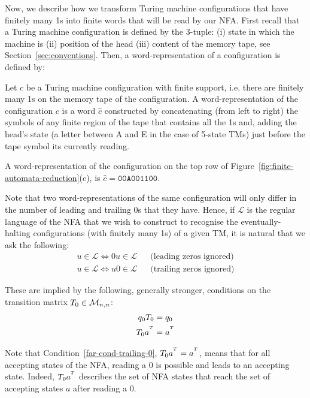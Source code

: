 Now, we describe how we transform Turing machine configurations that have finitely many 1s into finite words that will be read by our NFA. First recall that a Turing machine configuration is defined by the 3-tuple: (i) state in which the machine is (ii) position of the head (iii) content of the memory tape, see Section~\ref{sec:conventions}. Then, a word-representation of a configuration is defined by:

\begin{definition}\label{def:wordc}\normalfont
  Let $c$ be a Turing machine configuration with finite support, i.e. there are finitely many 1s on the memory tape of the configuration. A word-representation of the configuration $c$ is a word $\hat{c}$ constructed by concatenating (from left to right) the symbols of any finite region of the tape that contains all the 1s and, adding the head's state (a letter between A and E in the case of 5-state TMs) just before the tape symbol its currently reading.
\end{definition}

\begin{example}\normalfont
  A word-representation of the configuration on the top row of Figure~\ref{fig:finite-automata-reduction}(c), is $\hat{c} = \texttt{00A001100}$.
\end{example}

Note that two word-representations of the same configuration will only differ in the number of leading and trailing 0s that they have. Hence, if $\mathcal{L}$ is the regular language of the NFA that we wish to construct to recognise the eventually-halting configurations (with finitely many 1s) of a given TM, it is natural that we ask the following:
\begin{align*}
  u \in \mathcal{L} \iff 0u \in \mathcal{L} &  & \text{(leading zeros ignored)}
  \\
  u \in \mathcal{L} \iff u0 \in \mathcal{L} &  & \text{(trailing zeros ignored)}
\end{align*}

These are implied by the following, generally stronger, conditions on the transition matrix $T_0 \in \mathcal{M}_{n,n}$:
\begin{align}
  q_0 T_0    & = q_0
  \label{far-cond-leading-0}
  \\
  T_0 a^{^T} & = a^{^T}
  \label{far-cond-trailing-0}
\end{align}


Note that Condition~\ref{far-cond-trailing-0}, $T_0 a^{^T} = a^{^T}$, means that for all accepting states of the NFA, reading a 0 is possible and leads to an accepting state. Indeed, $T_0 a^{^T}$ describes the set of NFA states that reach the set of accepting states $a$ after reading a $0$.


